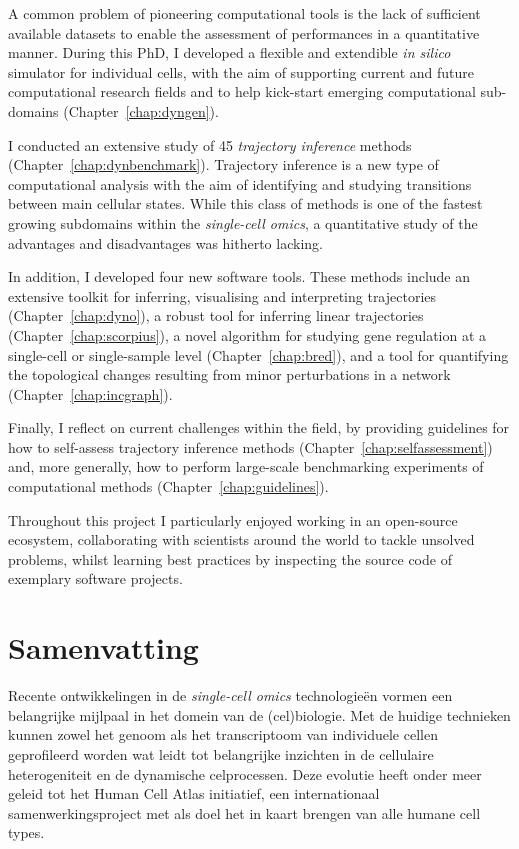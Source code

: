 A common problem of pioneering computational tools is the lack of sufficient available datasets to enable the assessment of performances in a quantitative manner. During this PhD, I developed a flexible and extendible \textit{in silico} simulator for individual cells, with the aim of supporting current and future computational research fields and to help kick-start emerging computational sub-domains (Chapter~\ref{chap:dyngen}).

I conducted an extensive study of 45 \textit{trajectory inference} methods (Chapter~\ref{chap:dynbenchmark}). Trajectory inference is a new type of computational analysis with the aim of identifying and studying transitions between main cellular states. While this class of methods is one of the fastest growing subdomains within the \textit{single-cell omics}, a quantitative study of the advantages and disadvantages was hitherto lacking.

In addition, I developed four new software tools. These methods include an extensive toolkit for inferring, visualising and interpreting trajectories (Chapter~\ref{chap:dyno}), a robust tool for inferring linear trajectories (Chapter~\ref{chap:scorpius}), a novel algorithm for studying gene regulation at a single-cell or single-sample level (Chapter~\ref{chap:bred}), and a tool for quantifying the topological changes resulting from minor perturbations in a network (Chapter~\ref{chap:incgraph}).

Finally, I reflect on current challenges within the field, by providing guidelines for how to self-assess trajectory inference methods (Chapter~\ref{chap:selfassessment}) and, more generally, how to perform large-scale benchmarking experiments of computational methods (Chapter~\ref{chap:guidelines}).

Throughout this project I particularly enjoyed working in an open-source ecosystem, collaborating with scientists around the world to tackle unsolved problems, whilst learning best practices by inspecting the source code of exemplary software projects. 


\chapter*{Samenvatting}
\vspace{-8em}

Recente ontwikkelingen in de \textit{single-cell omics} technologieën vormen een belangrijke mijlpaal in het domein van de (cel)biologie. Met de huidige technieken kunnen zowel het genoom als het transcriptoom van individuele cellen geprofileerd worden wat leidt tot belangrijke inzichten in de cellulaire heterogeniteit en de dynamische celprocessen. Deze evolutie heeft onder meer geleid tot het Human Cell Atlas initiatief, een internationaal samenwerkingsproject met als doel het in kaart brengen van alle humane cell types.

